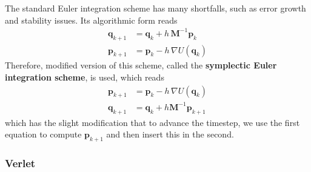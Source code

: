 \documentclass{article}
\begin{document}
      The standard Euler integration scheme has many shortfalls, such as error growth and stability issues. Its algorithmic form reads 
      \begin{align*}
          \mathbf{q}_{k + 1} & = \mathbf{q}_k + h \, \mathbf{M}^{-1} \mathbf{p}_k \\
          \mathbf{p}_{k + 1} & = \mathbf{p}_k - h \, \nabla U(\mathbf{q}_k)
      \end{align*}
      Therefore, modified version of this scheme, called the \textbf{symplectic Euler integration scheme}, is used, which reads 
      \begin{align*}
          \mathbf{p}_{k+1} & = \mathbf{p}_k - h \, \nabla U(\mathbf{q}_k) \\
          \mathbf{q}_{k+1} & = \mathbf{q}_k + h \mathbf{M}^{-1} \mathbf{p}_{k+1} 
      \end{align*}
      which has the slight modification that to advance the timestep, we use the first equation to compute $\mathbf{p}_{k+1}$ and then insert this in the second. 

    \subsubsection{Verlet}
\end{document}
